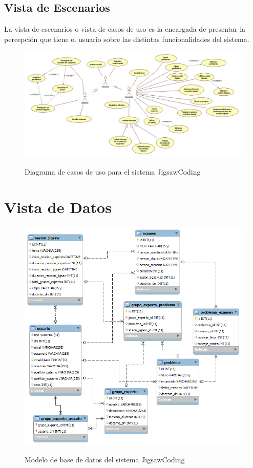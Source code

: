 \begin{landscape}
\section{Vista de Escenarios}
La vista de escenarios o vista de casos de uso es la encargada de presentar la percepción que tiene el usuario sobre las distintas funcionalidades del sistema.
\begin{figure}[!h]
  \centering
  \includegraphics[scale=0.45]{figuras/casosdeuso/casos_de_uso.jpg}\\
  \caption[Casos de uso]{Diagrama de casos de uso para el sistema JigsawCoding}
  \label{fig:casos_de_uso}
\end{figure}
\end{landscape}
\clearpage
\section{Vista de Datos}
\begin{figure}[!h]
  \centering
  \includegraphics[scale=0.6]{figuras/sad/modelo_de_datos.png}\\
  \caption[Modelo de datos]{Modelo de base de datos del sistema JigsawCoding}\label{fig:modelo_de_datos}
\end{figure}
